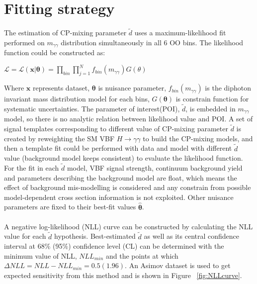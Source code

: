\section{Fitting strategy}
\label{sec:fit}

\paragraph{} The estimation of CP-mixing parameter $\tilde{d}$ uses a maximum-likelihood fit performed on $m_{\gamma\gamma}$ distribution simultaneously in all 6 OO bins. The likelihood function could be constructed as:

\begin{center}
\begin{math}
\mathcal{L} = \mathcal{L}(\boldsymbol{x} |\boldsymbol{\theta}) = \prod_{bin}\prod_{j=1}^{N}f_{bin}(m_{\gamma\gamma})G(\theta)
\end{math}
\end{center}


Where $\boldsymbol x$ represents dataset, $\boldsymbol \theta$ is nuisance parameter, $f_{bin}(m_{\gamma\gamma})$ is the diphoton invariant mass distribution model for each bins, $G(\boldsymbol \theta)$ is constrain function for systematic uncertainties. The parameter of interest(POI), $\tilde{d}$, is embedded in $m_{\gamma\gamma}$ model, so there is no analytic relation between likelihood value and POI. A set of signal templates corresponding to different value of CP-mixing parameter $\tilde{d}$ is created by reweighting the SM VBF $H\to\gamma\gamma$ to build the CP-mixing models, and then a template fit could be performed with data and model with different $\tilde{d}$ value (background model keeps consistent) to evaluate the likelihood function. For the fit in each $\tilde{d}$ model, VBF signal strength, continuum background yield and parameters describing the background model are float, which means the effect of background mis-modelling is considered and any constrain from possible model-dependent cross section information is not exploited. Other nuisance parameters are fixed to their best-fit values $\hat{\boldsymbol \theta}$. 


\paragraph{} A negative log-likelihood (NLL) curve can be constructed by calculating the NLL value for each $\tilde{d}$ hypothesis. Best-estimated $\tilde{d}$ as well as its central confidence interval at 68\% (95\%) confidence level (CL) can be determined with the minimum value of NLL, $NLL_{min}$ and the points at which $\Delta NLL = NLL-NLL_{min} = 0.5(1.96)$. An Asimov dataset is used to get expected sensitivity from this method and is shown in Figure ~\ref{fig:NLLcurve}. 


